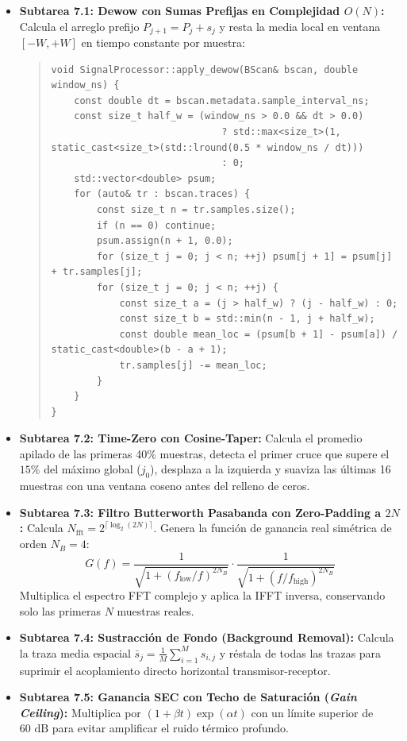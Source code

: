 \documentclass[11pt,a4paper]{article}
\begin{document}
\begin{itemize}
    \item \textbf{Subtarea 7.1: Dewow con Sumas Prefijas en Complejidad $O(N)$:}
    Calcula el arreglo prefijo $P_{j+1} = P_j + s_j$ y resta la media local en ventana $[-W, +W]$ en tiempo constante por muestra:
\begin{quote}
\small
\begin{verbatim}
void SignalProcessor::apply_dewow(BScan& bscan, double window_ns) {
    const double dt = bscan.metadata.sample_interval_ns;
    const size_t half_w = (window_ns > 0.0 && dt > 0.0)
                              ? std::max<size_t>(1, static_cast<size_t>(std::lround(0.5 * window_ns / dt)))
                              : 0;
    std::vector<double> psum;
    for (auto& tr : bscan.traces) {
        const size_t n = tr.samples.size();
        if (n == 0) continue;
        psum.assign(n + 1, 0.0);
        for (size_t j = 0; j < n; ++j) psum[j + 1] = psum[j] + tr.samples[j];
        for (size_t j = 0; j < n; ++j) {
            const size_t a = (j > half_w) ? (j - half_w) : 0;
            const size_t b = std::min(n - 1, j + half_w);
            const double mean_loc = (psum[b + 1] - psum[a]) / static_cast<double>(b - a + 1);
            tr.samples[j] -= mean_loc;
        }
    }
}
\end{verbatim}
\end{quote}

    \item \textbf{Subtarea 7.2: Time-Zero con Cosine-Taper:}
    Calcula el promedio apilado de las primeras 40\% muestras, detecta el primer cruce que supere el $15\%$ del máximo global ($j_0$), desplaza a la izquierda y suaviza las últimas 16 muestras con una ventana coseno antes del relleno de ceros.

    \item \textbf{Subtarea 7.3: Filtro Butterworth Pasabanda con Zero-Padding a $2N$:}
    Calcula $N_{\text{fft}} = 2^{\lceil \log_2(2N) \rceil}$. Genera la función de ganancia real simétrica de orden $N_B = 4$:
    \begin{equation}
        G(f) = \frac{1}{\sqrt{1 + (f_{\text{low}}/f)^{2N_B}}} \cdot \frac{1}{\sqrt{1 + (f/f_{\text{high}})^{2N_B}}}
    \end{equation}
    Multiplica el espectro FFT complejo y aplica la IFFT inversa, conservando solo las primeras $N$ muestras reales.

    \item \textbf{Subtarea 7.4: Sustracción de Fondo (Background Removal):}
    Calcula la traza media espacial $\bar{s}_j = \frac{1}{M}\sum_{i=1}^M s_{i,j}$ y réstala de todas las trazas para suprimir el acoplamiento directo horizontal transmisor-receptor.

    \item \textbf{Subtarea 7.5: Ganancia SEC con Techo de Saturación (\textit{Gain Ceiling}):}
    Multiplica por $(1 + \beta t)\exp(\alpha t)$ con un límite superior de $60\text{ dB}$ para evitar amplificar el ruido térmico profundo.
\end{itemize}
\end{document}
